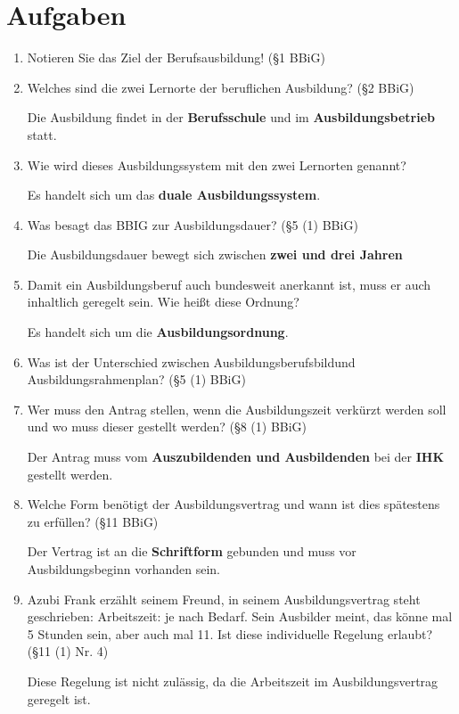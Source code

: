 \documentclass[a4paper,11pt]{scrartcl}	%
\begin{document}
\section{Aufgaben}

\begin{enumerate}
	\item Notieren Sie das Ziel der Berufsausbildung! (§1 BBiG)\par
	
	\item Welches sind die zwei Lernorte der beruflichen Ausbildung? (§2 BBiG)\par
	Die Ausbildung findet in der \textbf{Berufsschule} und im \textbf{Ausbildungsbetrieb} statt.
	\item Wie wird dieses Ausbildungssystem mit den zwei Lernorten genannt?\par
	Es handelt sich um das \textbf{duale Ausbildungssystem}.
	\item Was besagt das BBIG zur Ausbildungsdauer? (§5 (1) BBiG)\par
	Die Ausbildungsdauer bewegt sich zwischen \textbf{zwei und drei Jahren} 
	\item Damit ein Ausbildungsberuf auch bundesweit anerkannt ist, muss er auch inhaltlich geregelt sein. Wie heißt diese Ordnung?\par
	Es handelt sich um die \textbf{Ausbildungsordnung}.
	\item Was ist der Unterschied zwischen \glqq Ausbildungsberufsbild\grqq und \glqq Ausbildungsrahmenplan\grqq ? (§5 (1) BBiG)\par
	\item Wer muss den Antrag stellen, wenn die Ausbildungszeit verkürzt werden soll und wo muss dieser gestellt werden? (§8 (1) BBiG)\par
	Der Antrag muss vom \textbf{Auszubildenden und Ausbildenden} bei der \textbf{IHK} gestellt werden.
	\item Welche Form benötigt der Ausbildungsvertrag und wann ist dies spätestens zu erfüllen? (§11 BBiG)\par
	Der Vertrag ist an die \textbf{Schriftform} gebunden und muss vor Ausbildungsbeginn vorhanden sein.
	\item Azubi Frank erzählt seinem Freund, in seinem Ausbildungsvertrag steht geschrieben: Arbeitszeit: 
	je nach Bedarf. Sein Ausbilder meint, das könne mal 5 Stunden sein, aber auch mal 11. Ist diese individuelle
	Regelung erlaubt? (§11 (1) Nr. 4)\par
	Diese Regelung ist nicht zulässig, da die Arbeitszeit im Ausbildungsvertrag geregelt ist.

\end{enumerate}
\end{document}
